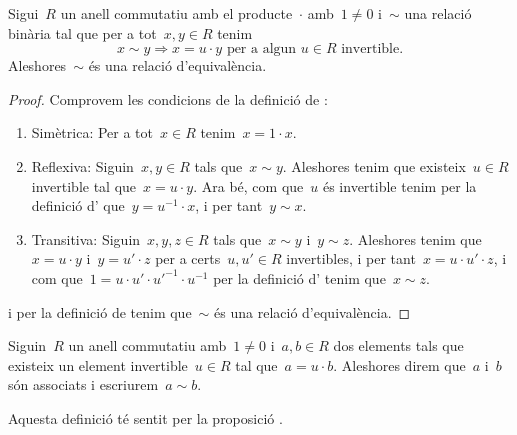 \documentclass[../../main.tex]{subfiles}
\begin{document}
    \begin{proposition}
        \label{prop:associats és relació d'equivalència}
        Sigui~\(R\) un anell commutatiu amb el producte~\(\cdot\) amb~\(1\neq0\) i~\(\sim\) una relació binària tal que per a tot~\(x,y\in R\) tenim
        \[
            x\sim y\Longrightarrow x=u\cdot y\text{ per a algun }u\in R\text{ invertible}.
        \]
        Aleshores~\(\sim\) és una relació d'equivalència.
        \begin{proof}
            Comprovem les condicions de la definició de :
            \begin{enumerate}
                \item Simètrica: Per a tot~\(x\in R\) tenim~\(x=1\cdot x\).
                \item Reflexiva: Siguin~\(x,y\in R\) tals que~\(x\sim y\).
                Aleshores tenim que existeix~\(u\in R\) invertible tal que~\(x=u\cdot y\).
                Ara bé, com que~\(u\) és invertible tenim per la definició d' que~\(y=u^{-1}\cdot x\), i per tant~\(y\sim x\).
                \item Transitiva: Siguin~\(x,y,z\in R\) tals que~\(x\sim y\) i~\(y\sim z\).
                Aleshores tenim que~\(x=u\cdot y\) i~\(y=u'\cdot z\) per a certs~\(u,u'\in R\) invertibles, i per tant~\(x=u\cdot u'\cdot z\), i com que~\(1=u\cdot u'\cdot {u'}^{-1}\cdot{u}^{-1}\) per la definició d' tenim que~\(x\sim z\).
            \end{enumerate}
            i per la definició de  tenim que~\(\sim\) és una relació d'equivalència.
        \end{proof}
    \end{proposition}
    \begin{definition}
        \label{def:elements associats}
        Siguin~\(R\) un anell commutatiu amb~\(1\neq0\) i~\(a,b\in R\) dos elements tals que existeix un element invertible~\(u\in R\) tal que~\(a=u\cdot b\).
        Aleshores direm que~\(a\) i~\(b\) són associats i escriurem~\(a\sim b\).

        Aquesta definició té sentit per la proposició .
    \end{definition}
\end{document}
